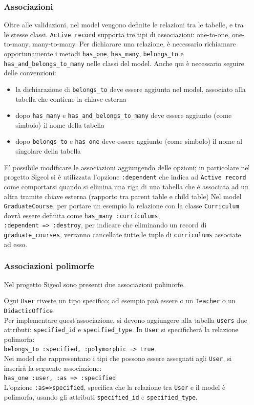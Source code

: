 \documentclass[11pt,a4paper]{article}
\begin{document}
\subsubsection*{Associazioni}
Oltre alle validazioni, nel model vengono definite le relazioni tra le tabelle, e tra le stesse classi. \verb|Active record| supporta tre tipi di associazioni: one-to-one, one-to-many, many-to-many.
Per dichiarare una relazione, è necessario richiamare opportunamente i metodi \verb|has_one|, \verb|has_many|, \verb|belongs_to| e \verb|has_and_belongs_to_many| nelle classi del model.
Anche qui è necessario seguire delle convenzioni:
\begin{itemize}
 \item la dichiarazione di \verb|belongs_to| deve essere aggiunta nel model, associato alla tabella che contiene la chiave esterna
 \item dopo \verb|has_many| e \verb|has_and_belongs_to_many| deve essere aggiunto (come simbolo) il nome della tabella
 \item dopo \verb|belongs_to| e \verb|has_one| deve essere aggiunto (come simbolo) il nome al singolare della tabella
\end{itemize}

E' possibile modificare le associazioni aggiungendo delle opzioni; in particolare nel progetto Sigeol si è utilizzata l'opzione \verb|:dependent| che indica ad \verb|Active record| come comportarsi quando si elimina una riga di una tabella che è associata ad un altra tramite chiave esterna (rapporto tra parent table e child table)
Nel model \verb|GraduateCourse|, per portare un esempio la relazione con la classe \verb|Curriculum| dovrà essere definita come \verb|has_many :curriculums|,\\ \verb|:dependent => :destroy|, per indicare che eliminando un record di \\ \verb|graduate_courses|, verranno cancellate tutte le tuple di \verb|curriculums| associate ad esso.
\subsubsection*{Associazioni polimorfe}
Nel progetto Sigeol sono presenti due associazioni polimorfe.

Ogni \verb|User| riveste un tipo specifico; ad esempio può essere o un \verb|Teacher| o un \verb|DidacticOffice|\\
Per implementare quest'associazione, si devono aggiungere alla tabella \verb|users| due attributi: \verb|specified_id| e \verb|specified_type|.
In \verb|User| si specificherà la relazione polimorfa:\\
\verb|belongs_to :specified, :polymorphic => true|.\\
Nei model che rappresentano i tipi che possono essere assegnati agli \verb|User|, si inserirà la seguente associazione:\\
\verb|has_one :user, :as => :specified|\\
L'opzione \verb|:as=>specified|, specifica che la relazione tra \verb|User| e il model è polimorfa, usando gli attributi \verb|specified_id| e \verb|specified_type|.
\end{document}
